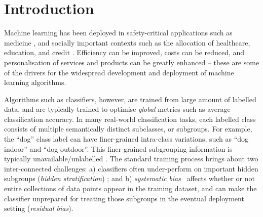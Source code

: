 \section{Introduction}%
\label{sec:introduction}
Machine learning has been deployed in safety-critical applications such as medicine \citep[e.g.][]{DunYiLanReetal19}, and socially important contexts such as the allocation of healthcare, education, and credit \citep[e.g.][]{HurAde17,RagBarKleLev20}.
%
Efficiency can be improved, costs can be reduced, and personalisation of services and products can be greatly enhanced -- these are some of the drivers for the widespread development and deployment of machine learning algorithms. 
%

Algorithms such as classifiers, however, are trained from large amount of labelled data, and are typically trained to optimise \emph{global} metrics such as average classification accuracy.
%
In many real-world classification tasks, each labelled class consists of multiple semantically distinct subclasses, or subgroups.
For example, the ``dog'' class label can have finer-grained intra-class variations, such as ``dog indoor'' and ``dog outdoor''.
%
This finer-grained subgrouping information is typically unavailable/unlabelled \citep[e.g.][]{SohDunAngGuetal20,nam2020learning}.
%
The standard training process brings about two inter-connected challenges: a) classifiers often under-perform on important hidden subgroups (\emph{hidden stratification}) \citep{RayDunCarRe20,SohDunAngGuetal20};
and b) \emph{systematic bias}~\citep{kallus2018residual} affects whether or not entire collections of data points appear in the training dataset,
and can make the classifier unprepared for treating those subgroups in the eventual deployment setting
(\emph{residual bias}). %

